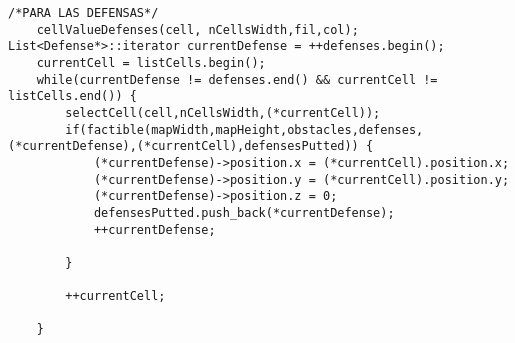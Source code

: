 \begin{lstlisting}
/*PARA LAS DEFENSAS*/
	cellValueDefenses(cell, nCellsWidth,fil,col);
List<Defense*>::iterator currentDefense = ++defenses.begin();
	currentCell = listCells.begin();
    while(currentDefense != defenses.end() && currentCell != listCells.end()) {
    	selectCell(cell,nCellsWidth,(*currentCell));
		if(factible(mapWidth,mapHeight,obstacles,defenses,(*currentDefense),(*currentCell),defensesPutted)) {
		    (*currentDefense)->position.x = (*currentCell).position.x;
		    (*currentDefense)->position.y = (*currentCell).position.y;
		    (*currentDefense)->position.z = 0;
		    defensesPutted.push_back(*currentDefense);
			++currentDefense;

		}

		++currentCell;

    }
\end{lstlisting}
